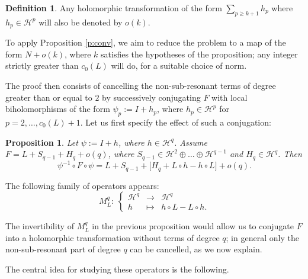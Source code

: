 \documentclass[english,11pt]{amsart}
\newtheorem{proposition}[theorem]{Proposition}
\theoremstyle{definition}
\newtheorem{definition}[theorem]{Definition}
\theoremstyle{remark}
\numberwithin{equation}{section}
\begin{document}
\begin{definition}
Any holomorphic transformation of the form $\sum_{p \geq k+1} h_p$ where $h_p \in \mathcal{H}^p$ will also be denoted by $o(k)$.
\end{definition}

To apply Proposition \ref{p:conv}, we aim to reduce the problem to a map of the form $N + o(k)$, where $k$ satisfies the hypotheses of the proposition; any integer strictly greater than $c_0(L)$ will do, for a suitable choice of norm.

The proof then consists of cancelling the non-sub-resonant terms of degree greater than or equal to $2$ by successively conjugating $F$ with local biholomorphisms of the form $\psi_p := I + h_p$, where $h_p \in \mathcal{H}^p$ for $p = 2, \dots, c_0(L) + 1$. Let us first specify the effect of such a conjugation:

\begin{proposition}\label{p:cdv}
Let $\psi := I + h$, where $h \in \mathcal{H}^q$. Assume $F = L + S_{q-1} + H_q + o(q)$, where $S_{q-1} \in \mathcal{H}^2 \oplus \dots \oplus \mathcal{H}^{q-1}$ and $H_q \in \mathcal{H}^q$. Then
\[
\psi^{-1} \circ F \circ \psi = L + S_{q-1} + \big[ H_q + L \circ h - h \circ L \big] + o(q).
\]
\end{proposition}

The following family of operators appears:
\[
M_L^q :\ \left\{
\begin{array}{ccl}
\mathcal{H}^q & \longrightarrow & \mathcal{H}^q\\[3pt]
h & \longmapsto & h \circ L - L \circ h.
\end{array}
\right.
\]

The invertibility of $M_L^q$ in the previous proposition would allow us to conjugate $F$ into a holomorphic transformation without terms of degree $q$; in general only the non-sub-resonant part of degree $q$ can be cancelled, as we now explain.


The central idea for studying these operators is the following.
\end{document}

